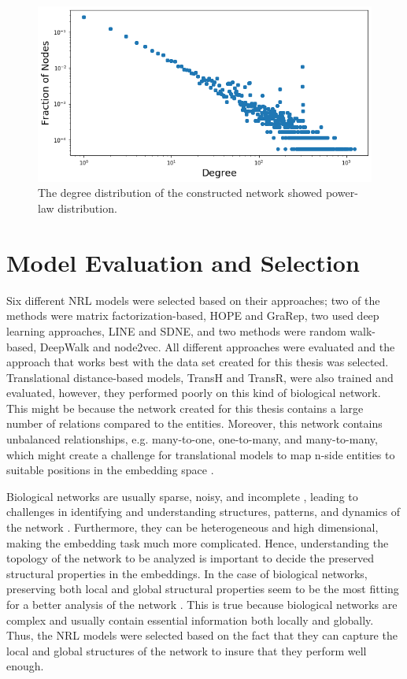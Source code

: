\begin{figure}[h!]
    \centering
    \includegraphics[scale=0.5]
    {figures/degree_distribution.png}
    \caption[Degree distribution of network]{\label{fig:degree_distribution}The degree distribution of the constructed network showed power-law distribution.}
\end{figure}

\section{Model Evaluation and Selection}
Six different \ac{NRL} models were selected based on their approaches; two of the methods were matrix factorization-based, \ac{HOPE} and \ac{GraRep}, two used deep learning approaches, \ac{LINE} and \ac{SDNE}, and two methods were random walk-based, DeepWalk and node2vec. All different approaches were evaluated and the approach that works best with the data set created for this thesis was selected. Translational distance-based models, TransH and TransR, were also trained and evaluated, however, they performed poorly on this kind of biological network. This might be because the network created for this thesis contains a large number of relations compared to the entities. Moreover, this network contains unbalanced relationships, e.g. many-to-one, one-to-many, and many-to-many, which might create a challenge for translational models to map n-side entities to suitable positions in the embedding space \cite{liang_predicting_2019}.

Biological networks are usually sparse, noisy, and incomplete \cite{nickel_review_2016}, leading to challenges in identifying and understanding structures, patterns, and dynamics of the network \cite{wang_unsupervised_2016}. Furthermore, they can be heterogeneous and high dimensional, making the embedding task much more complicated. Hence, understanding the topology of the network to be analyzed is important to decide the preserved structural properties in the embeddings. In the case of biological networks, preserving both local and global structural properties seem to be the most fitting for a better analysis of the network \cite{su_network_2018}. This is true because biological networks are complex and usually contain essential information both locally and globally. Thus, the \ac{NRL} models were selected based on the fact that they can capture the local and global structures of the network to insure that they perform well enough.

